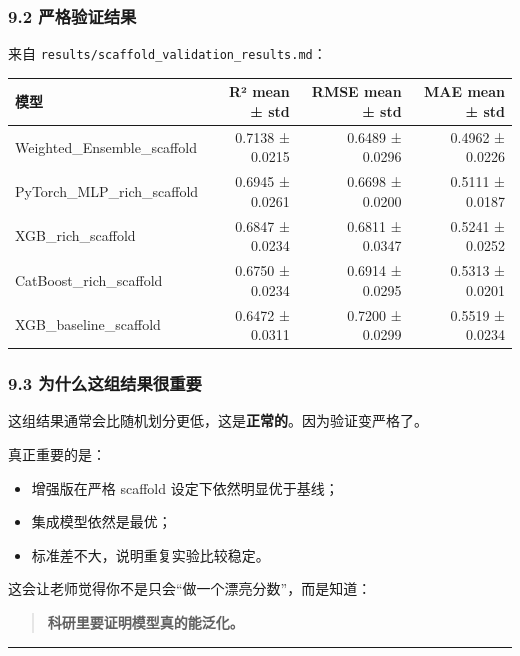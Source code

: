 \documentclass[
  ,
]{ctexart}
\providecommand{\tightlist}{%
  \setlength{\itemsep}{0pt}\setlength{\parskip}{0pt}}
\begin{document}
\hypertarget{ux4e25ux683cux9a8cux8bc1ux7ed3ux679c}{%
\subsubsection{9.2
严格验证结果}\label{ux4e25ux683cux9a8cux8bc1ux7ed3ux679c}}

来自 \texttt{results/scaffold\_validation\_results.md}：

\begin{longtable}[]{@{}lrrr@{}}
\toprule
模型 & R² mean ± std & RMSE mean ± std & MAE mean ± std \\
\midrule
\endhead
Weighted\_Ensemble\_scaffold & 0.7138 ± 0.0215 & 0.6489 ± 0.0296 &
0.4962 ± 0.0226 \\
PyTorch\_MLP\_rich\_scaffold & 0.6945 ± 0.0261 & 0.6698 ± 0.0200 &
0.5111 ± 0.0187 \\
XGB\_rich\_scaffold & 0.6847 ± 0.0234 & 0.6811 ± 0.0347 & 0.5241 ±
0.0252 \\
CatBoost\_rich\_scaffold & 0.6750 ± 0.0234 & 0.6914 ± 0.0295 & 0.5313 ±
0.0201 \\
XGB\_baseline\_scaffold & 0.6472 ± 0.0311 & 0.7200 ± 0.0299 & 0.5519 ±
0.0234 \\
\bottomrule
\end{longtable}

\hypertarget{ux4e3aux4ec0ux4e48ux8fd9ux7ec4ux7ed3ux679cux5f88ux91cdux8981}{%
\subsubsection{9.3
为什么这组结果很重要}\label{ux4e3aux4ec0ux4e48ux8fd9ux7ec4ux7ed3ux679cux5f88ux91cdux8981}}

这组结果通常会比随机划分更低，这是\textbf{正常的}。因为验证变严格了。

真正重要的是：

\begin{itemize}
\tightlist
\item
  增强版在严格 scaffold 设定下依然明显优于基线；
\item
  集成模型依然是最优；
\item
  标准差不大，说明重复实验比较稳定。
\end{itemize}

这会让老师觉得你不是只会``做一个漂亮分数''，而是知道：

\begin{quote}
\textbf{科研里要证明模型真的能泛化。}
\end{quote}

\begin{center}\rule{0.5\linewidth}{0.5pt}\end{center}
\end{document}

